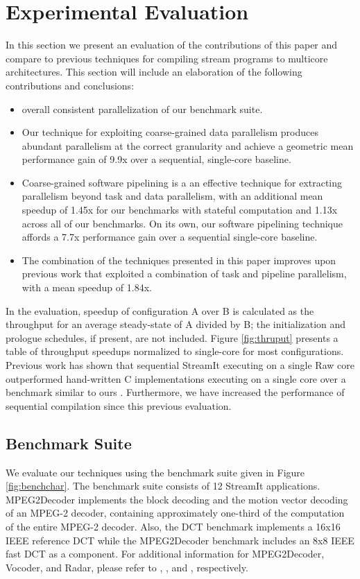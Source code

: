 \section{Experimental Evaluation}

In this section we present an evaluation of the contributions of this
paper and compare to previous techniques for compiling stream programs
to multicore architectures.  This section will include an elaboration
of the following contributions and conclusions:

\begin{itemize}
\item overall consistent parallelization of our benchmark suite.

\item Our technique for exploiting coarse-grained data parallelism
produces abundant parallelism at the correct granularity and achieve a
geometric mean performance gain of 9.9x over a sequential, single-core
baseline.
\item Coarse-grained software pipelining is a
an effective technique for extracting parallelism beyond task and data
parallelism, with an additional mean speedup of 1.45x for
our benchmarks with stateful computation and 1.13x across all of our
benchmarks. On its own, our software pipelining technique affords a
7.7x performance gain over a sequential single-core baseline.
\item The combination of the techniques presented in this paper
improves upon previous work that exploited a combination of task and
pipeline parallelism, with a mean speedup of 1.84x.
\end{itemize}

In the evaluation, speedup of configuration A over B is calculated as
the throughput for an average steady-state of A divided by B; the
initialization and prologue schedules, if present, are not
included. Figure \ref{fig:thruput} presents a table of throughput
speedups normalized to single-core for most configurations.  Previous
work has shown that sequential StreamIt executing on a single Raw core
outperformed hand-written C implementations executing on a single core
over a benchmark similar to ours \cite{raw_isca}. Furthermore, we have
increased the performance of sequential compilation since this
previous evaluation.

\subsection{Benchmark Suite}
We evaluate our techniques using the benchmark suite given in Figure
\ref{fig:benchchar}.   The benchmark suite consists of 12 StreamIt
applications. MPEG2Decoder implements the block decoding and the
motion vector decoding of an MPEG-2 decoder, containing approximately
one-third of the computation of the entire MPEG-2 decoder.  Also, the
DCT benchmark implements a 16x16 IEEE reference DCT while the
MPEG2Decoder benchmark includes an 8x8 IEEE fast DCT as a component.
For additional information for MPEG2Decoder, Vocoder, and Radar,
please refer to \cite{ipdps2006},
\cite{seneff80}, and \cite{pca}, respectively. 

